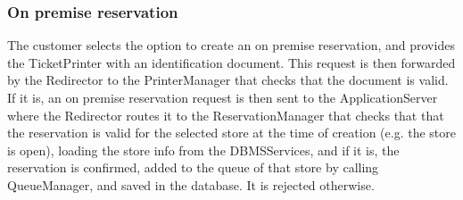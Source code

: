 \subsubsection{On premise reservation}
\begin{figure}[H]
	\noindent
\end{figure}
The customer selects the option to create an on premise reservation, and provides the TicketPrinter with an identification document. This request is then forwarded by the Redirector to the PrinterManager that checks that the document is valid. If it is, an on premise reservation request is then sent to the ApplicationServer where the Redirector routes it to the ReservationManager that checks that that the reservation is valid for the selected store at the time of creation (e.g. the store is open), loading the store info from the DBMSServices, and if it is, the reservation is confirmed, added to the queue of that store by calling QueueManager, and saved in the database. It is rejected otherwise.

